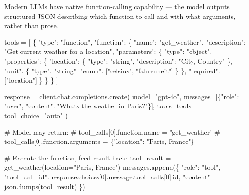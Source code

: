 \documentclass[11pt]{article}
\newenvironment{Shaded}{\begin{snugshade}}{\end{snugshade}}
\newcommand{\BuiltInTok}[1]{\textcolor[rgb]{0.50,0.55,0.55}{#1}}
\newcommand{\CommentTok}[1]{\textcolor[rgb]{0.48,0.49,0.49}{#1}}
\newcommand{\DecValTok}[1]{\textcolor[rgb]{0.96,0.45,0.00}{#1}}
\newcommand{\NormalTok}[1]{\textcolor[rgb]{0.81,0.81,0.76}{#1}}
\newcommand{\OperatorTok}[1]{\textcolor[rgb]{0.81,0.81,0.76}{#1}}
\newcommand{\StringTok}[1]{\textcolor[rgb]{0.96,0.31,0.31}{#1}}
\begin{document}
Modern LLMs have native function-calling capability --- the model outputs structured JSON describing which function to call and with what arguments, rather than prose.


\begin{Shaded}
\begin{Highlighting}[]
\NormalTok{tools }\OperatorTok{=}\NormalTok{ [}
\NormalTok{    \{}
        \StringTok{"type"}\NormalTok{: }\StringTok{"function"}\NormalTok{,}
        \StringTok{"function"}\NormalTok{: \{}
            \StringTok{"name"}\NormalTok{: }\StringTok{"get\_weather"}\NormalTok{,}
            \StringTok{"description"}\NormalTok{: }\StringTok{"Get current weather for a location"}\NormalTok{,}
            \StringTok{"parameters"}\NormalTok{: \{}
                \StringTok{"type"}\NormalTok{: }\StringTok{"object"}\NormalTok{,}
                \StringTok{"properties"}\NormalTok{: \{}
                    \StringTok{"location"}\NormalTok{: \{}
                        \StringTok{"type"}\NormalTok{: }\StringTok{"string"}\NormalTok{,}
                        \StringTok{"description"}\NormalTok{: }\StringTok{"City, Country"}
\NormalTok{                    \},}
                    \StringTok{"unit"}\NormalTok{: \{}
                        \StringTok{"type"}\NormalTok{: }\StringTok{"string"}\NormalTok{,}
                        \StringTok{"enum"}\NormalTok{: [}\StringTok{"celsius"}\NormalTok{, }\StringTok{"fahrenheit"}\NormalTok{]}
\NormalTok{                    \}}
\NormalTok{                \},}
                \StringTok{"required"}\NormalTok{: [}\StringTok{"location"}\NormalTok{]}
\NormalTok{            \}}
\NormalTok{        \}}
\NormalTok{    \}}
\NormalTok{]}

\NormalTok{response }\OperatorTok{=}\NormalTok{ client.chat.completions.create(}
\NormalTok{    model}\OperatorTok{=}\StringTok{"gpt{-}4o"}\NormalTok{,}
\NormalTok{    messages}\OperatorTok{=}\NormalTok{[\{}\StringTok{"role"}\NormalTok{: }\StringTok{"user"}\NormalTok{, }\StringTok{"content"}\NormalTok{: }\StringTok{"What\textquotesingle{}s the weather in Paris?"}\NormalTok{\}],}
\NormalTok{    tools}\OperatorTok{=}\NormalTok{tools,}
\NormalTok{    tool\_choice}\OperatorTok{=}\StringTok{"auto"}
\NormalTok{)}

\CommentTok{\# Model may return:}
\CommentTok{\# tool\_calls[0].function.name = "get\_weather"}
\CommentTok{\# tool\_calls[0].function.arguments = \textquotesingle{}\{"location": "Paris, France"\}\textquotesingle{}}

\CommentTok{\# Execute the function, feed result back:}
\NormalTok{tool\_result }\OperatorTok{=}\NormalTok{ get\_weather(location}\OperatorTok{=}\StringTok{"Paris, France"}\NormalTok{)}
\NormalTok{messages.append(\{}
    \StringTok{"role"}\NormalTok{: }\StringTok{"tool"}\NormalTok{,}
    \StringTok{"tool\_call\_id"}\NormalTok{: response.choices[}\DecValTok{0}\NormalTok{].message.tool\_calls[}\DecValTok{0}\NormalTok{].}\BuiltInTok{id}\NormalTok{,}
    \StringTok{"content"}\NormalTok{: json.dumps(tool\_result)}
\NormalTok{\})}
\end{Highlighting}
\end{Shaded}
\end{document}
